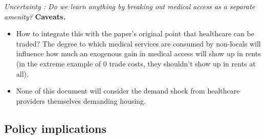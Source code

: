 \documentclass[11pt]{article}
\begin{document}
\textit{Uncertainty : Do we learn anything by breaking out medical access as a separate amenity?}
\textbf{Caveats.}
\begin{itemize}
    \item How to integrate this with the paper's original point that healthcare can be traded?  The degree to which medical services are consumed by non-locals will influence how much an exogenous gain in medical access will show up in rents (in the extreme example of 0 trade costs, they shouldn't show up in rents at all).
    \item None of this document will consider the demand shock from healthcare providers themselves demanding housing.   %
  
\end{itemize}

\medskip\noindent

\subsection*{Policy implications}
\end{document}
